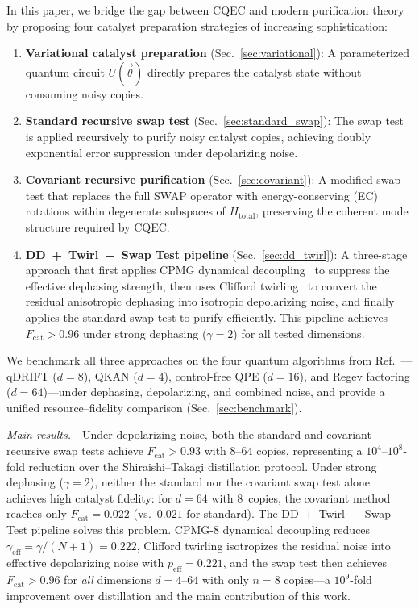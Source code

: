 \documentclass[prx,twocolumn,superscriptaddress,longbibliography,floatfix]{revtex4-2}
\begin{document}
In this paper, we bridge the gap between CQEC and modern purification theory by proposing four catalyst preparation strategies of increasing sophistication:
\begin{enumerate}
\item \textbf{Variational catalyst preparation} (Sec.~\ref{sec:variational}): A parameterized quantum circuit $U(\vec\theta)$ directly prepares the catalyst state without consuming noisy copies.
\item \textbf{Standard recursive swap test} (Sec.~\ref{sec:standard_swap}): The swap test~\cite{Childs2025} is applied recursively to purify noisy catalyst copies, achieving doubly exponential error suppression under depolarizing noise.
\item \textbf{Covariant recursive purification} (Sec.~\ref{sec:covariant}): A modified swap test that replaces the full SWAP operator with energy-conserving (EC) rotations within degenerate subspaces of $H_\mathrm{total}$, preserving the coherent mode structure required by CQEC.
\item \textbf{DD~+~Twirl~+~Swap Test pipeline} (Sec.~\ref{sec:dd_twirl}): A three-stage approach that first applies CPMG dynamical decoupling~\cite{MeiboomGill1958,Viola1999} to suppress the effective dephasing strength, then uses Clifford twirling~\cite{Wallman2016} to convert the residual anisotropic dephasing into isotropic depolarizing noise, and finally applies the standard swap test to purify efficiently. This pipeline achieves $F_\mathrm{cat} > 0.96$ under strong dephasing ($\gamma = 2$) for all tested dimensions.
\end{enumerate}

We benchmark all three approaches on the four quantum algorithms from Ref.~\cite{Wakaura2026}---qDRIFT ($d = 8$), QKAN ($d = 4$), control-free QPE ($d = 16$), and Regev factoring ($d = 64$)---under dephasing, depolarizing, and combined noise, and provide a unified resource--fidelity comparison (Sec.~\ref{sec:benchmark}).

\emph{Main results.}---Under depolarizing noise, both the standard and covariant recursive swap tests achieve $F_\mathrm{cat} > 0.93$ with 8--64 copies, representing a $10^4$--$10^8$-fold reduction over the Shiraishi--Takagi distillation protocol.
Under strong dephasing ($\gamma = 2$), neither the standard nor the covariant swap test alone achieves high catalyst fidelity: for $d = 64$ with 8~copies, the covariant method reaches only $F_\mathrm{cat} = 0.022$ (vs.\ $0.021$ for standard).
The DD~+~Twirl~+~Swap Test pipeline solves this problem.
CPMG-8 dynamical decoupling reduces $\gamma_\mathrm{eff} = \gamma/(N+1) = 0.222$, Clifford twirling isotropizes the residual noise into effective depolarizing noise with $p_\mathrm{eff} = 0.221$, and the swap test then achieves $F_\mathrm{cat} > 0.96$ for \emph{all} dimensions $d = 4$--$64$ with only $n = 8$ copies---a $10^9$-fold improvement over distillation and the main contribution of this work.
\end{document}

